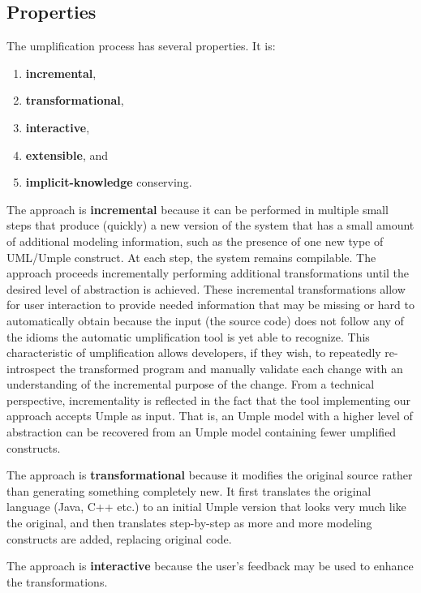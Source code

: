 \subsection{Properties}

The umplification process has several properties. It is:
\begin{enumerate}
 \item \textbf{incremental}, 
 \item \textbf{transformational},
 \item \textbf{interactive},  
 \item \textbf{extensible}, and
 \item \textbf{implicit-knowledge} conserving. 
\end{enumerate}

The approach is \textbf{incremental} because it can be performed in multiple small steps that produce (quickly) a new version of the system that has a small amount of additional modeling information, such as the presence of one new type of UML/Umple construct. At each step, the system remains compilable. The approach proceeds incrementally performing additional transformations until the desired level of abstraction is achieved.	These incremental transformations allow for user interaction to provide needed information that may be missing or hard to automatically obtain because the input (the source code) does not follow any of the idioms the automatic umplification tool is yet able to recognize.
This characteristic of umplification allows developers, if they wish, to repeatedly re-introspect the transformed program and manually validate each change with an understanding of the incremental purpose of the change. From a technical perspective, incrementality is reflected in the fact that the tool implementing our approach accepts Umple as input. That is, an Umple model with a higher level of abstraction can be recovered from an Umple model containing fewer umplified constructs. 

The approach is \textbf{transformational} because it modifies the original source rather than generating something completely new. It first translates the original language (Java, C++ etc.) to an initial Umple version that looks very much like the original, and then translates step-by-step as more and more modeling constructs are added, replacing original code.

The approach is \textbf{interactive} because the user's feedback may be used to enhance the transformations.

